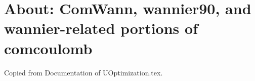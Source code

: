\documentclass[aps,prb,singlecolumn,preprintnumbers,amsmath,amssymb]{revtex4}
\begin{document}
%
%
%








\section{About: ComWann, wannier90, and wannier-related portions of comcoulomb\label{ComWann}}
Copied from Documentation of UOptimization.tex.
\end{document}
